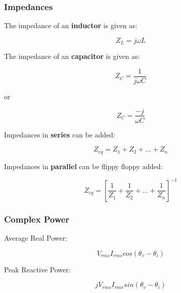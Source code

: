 \documentclass{article}
\begin{document}
\subsubsection*{Impedances}
\begin{center}
    The impedance of an \textbf{inductor} is given as:
\end{center}
\begin{equation}
    Z_L = j\omega L
\end{equation}
\begin{center}
    The impedance of an \textbf{capacitor} is given as:
\end{center}
\begin{equation}
    Z_C = \frac{1}{j\omega C}
\end{equation}
\begin{center}
    or
\end{center}
\begin{equation}
    Z_C = \frac{-j}{\omega C}
\end{equation}
\begin{center}
    Impedances in \textbf{series} can be added:
\end{center}
\begin{equation}
    Z_{eq} = Z_1 + Z_2 + ... + Z_n
\end{equation}
\begin{center}
    Impedances in \textbf{parallel} can be flippy floppy added:
\end{center}
\begin{equation}
    Z_{eq} = [\frac{1}{Z_1} + \frac{1}{Z_2} + ... + \frac{1}{Z_n}]^{-1}
\end{equation}
\subsubsection*{Complex Power}
\begin{center}
    Average Real Power:
\end{center}
\begin{equation}
    V_{rms}I_{rms}cos(\theta_v - \theta_i)
\end{equation}
\begin{center}
    Peak Reactive Power:
\end{center}
\begin{equation}
    jV_{rms}I_{rms}sin(\theta_v - \theta_i)
\end{equation}
\end{document}
